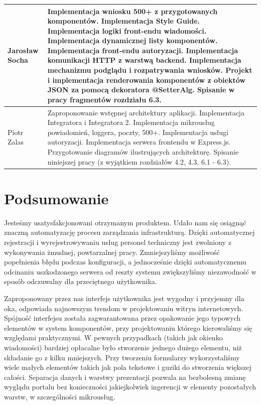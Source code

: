 \documentclass[licencjacka]{pracamgr}
\begin{document}
\begin{tabularx}{\linewidth}{|l|X|}
	\hline
	Jarosław Socha & Implementacja wniosku 500+ z przygotowanych komponentów. \newline
		Implementacja Style Guide. \newline
		Implementacja logiki front-endu wiadomości. \newline
		Implementacja dynamicznej listy komponentów. \newline
 		Implementacja front-endu autoryzacji. \newline
 		Implementacja komunikacji HTTP z warstwą backend. \newline
		Implementacja mechanizmu podglądu i rozpatrywania wniosków. \newline
		Projekt i implementacja renderowania komponentów z obiektów JSON za pomocą dekoratora @SetterAlg. \newline
		Spisanie w pracy fragmentów rozdziału 6.3.
	\\
	\hline 
	Piotr Zalas & Zaproponowanie wstępnej architektury aplikacji.\newline
	  Implementacja Integratora i Integratora 2.\newline
	  Implementacja mikrousług powiadomień, loggera, poczty, 500+.\newline
	  Implementacja usługi autoryzacji.\newline
	  Implementacja serwera frontendu w Express.js.\newline
	  Przygotowanie diagramów ilustrujących architekturę.\newline
	  Spisanie niniejszej pracy (z wyjątkiem rozdziałów 4.2, 4.3, 6.1 - 6.3).\\
	\hline
\end{tabularx}

\chapter{Podsumowanie}

Jesteśmy usatysfakcjonowani otrzymanym produktem. Udało nam się osiągnąć znaczną
automatyzację procesu zarządzania infrastrukturą. Dzięki automatycznej rejestracji i
wyrejestrowywaniu usług personel techniczny jest zwolniony z wykonywania żmudnej,
powtarzalnej pracy. Zmniejszyliśmy możliwość popełnienia błędu podczas konfiguracji,
a jednocześnie dzięki automatycznemu odcinaniu uszkodzonego serwera od reszty systemu
zwiększyliśmy niezawodność w sposób odczuwalny dla przeciętnego użytkownika.

Zaproponowany przez nas interfejs użytkownika jest wygodny i przyjemny dla oka,
odpowiada najnowszym trendom w projektowaniu witryn internetowych. Spójność interfejsu
została zagwarantowana przez opakowanie jego typowych elementów w system komponentów,
przy projektowaniu którego kierowaliśmy się względami praktycznymi. W pewnych przypadkach
(takich jak okienko wiadomości) bardziej opłacalne było stworzenie jednego dużego
elementu, niż składanie go z kilku mniejszych. Przy tworzeniu formularzy wykorzystaliśmy
wiele małych elementów takich jak pola tekstowe i guziki do stworzenia większej
całości. Separacja danych i warstwy prezentacji pozwala na bezbolesną zmianę wyglądu
portalu bez konieczności jakiejkolwiek ingerencji w elementy pozostałych warstw, w
szczególności mikrousług.
\end{document}
